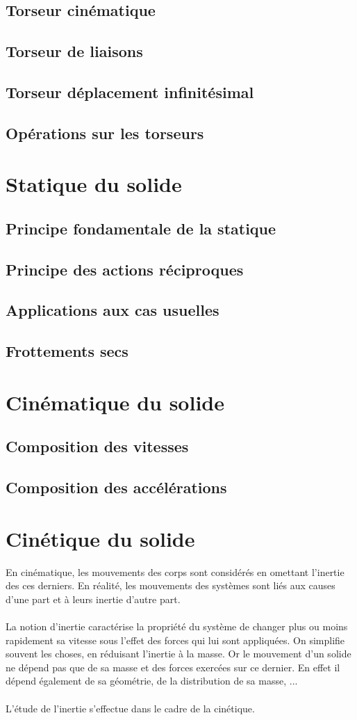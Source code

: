 \section{Torseur cinématique}
\section{Torseur de liaisons}
\section{Torseur déplacement infinitésimal}
\section{Opérations sur les torseurs}
\chapter{Statique du solide}
\section{Principe fondamentale de la statique}
\section{Principe des actions réciproques}
\section{Applications aux cas usuelles}
\section{Frottements secs}
\chapter{Cinématique du solide}
\section{Composition des vitesses}
\section{Composition des accélérations}
\chapter{Cinétique du solide}
En cinématique, les mouvements des corps sont considérés en omettant l'inertie des ces derniers.
En réalité, les mouvements des systèmes sont liés aux causes d'une part et à leurs inertie d'autre part.\\
\\
La notion d'inertie caractérise la propriété du système de changer plus ou moins rapidement sa vitesse sous l'effet des forces qui lui sont appliquées.
On simplifie souvent les choses, en réduisant l'inertie à la masse. Or le mouvement d'un solide ne dépend pas que de sa masse et des forces exercées sur ce dernier.
En effet il dépend également de sa géométrie, de la distribution de sa masse, ...
\\
\\
L'étude de l'inertie s'effectue dans le cadre de la cinétique.
